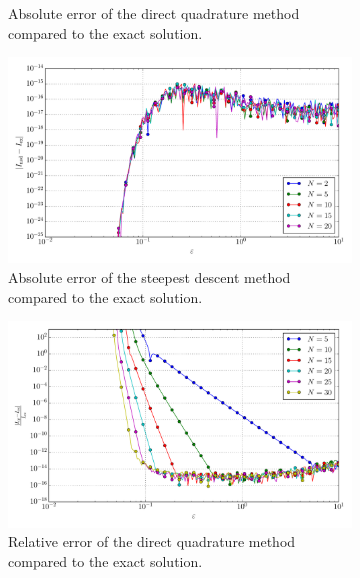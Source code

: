 \documentclass[a4paper,10pt]{article}
\begin{document}
\begin{figure}[ht!]
\begin{subfigure}[t]{0.5\linewidth}
    \caption{Absolute error of the direct quadrature method compared to the exact solution.}
    \label{fig:tp_2d_conv_eps_01_10_err_qr}
  \end{subfigure}
  \begin{subfigure}[t]{0.5\linewidth}
    \includegraphics[width=\linewidth]{./plots/tp_2d_conv_eps_(0,1)_(1,0)_err_nsd.pdf}
    \caption{Absolute error of the steepest descent method compared to the exact solution.}
    \label{fig:tp_2d_conv_eps_01_10_err_nsd}
  \end{subfigure}
  \begin{subfigure}[t]{0.5\linewidth}
    \includegraphics[width=\linewidth]{./plots/tp_2d_conv_eps_(0,1)_(1,0)_err_rel_qr.pdf}
    \caption{Relative error of the direct quadrature method compared to the exact solution.}
    \label{fig:tp_2d_conv_eps_01_10_err_qr}
  \end{subfigure}
  \begin{subfigure}[t]{0.5\linewidth}

\end{subfigure}
\end{figure}
\end{document}
